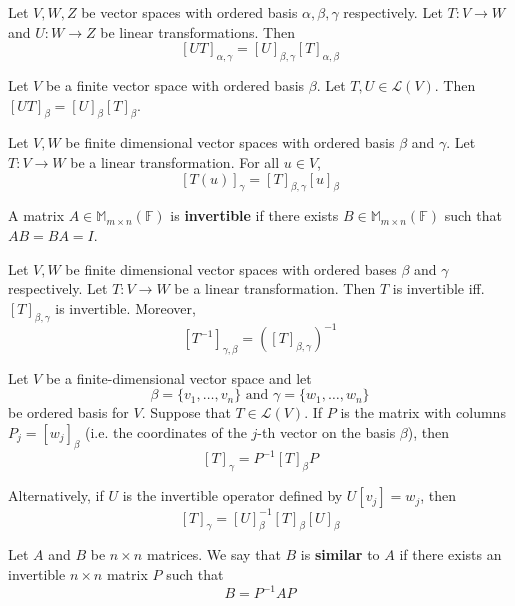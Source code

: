 \begin{theorem}
	Let $V, W, Z$ be vector spaces with ordered basis $\alpha, \beta, \gamma$ respectively. Let $T : V \longrightarrow W$ and $U : W \longrightarrow Z$ be linear transformations. Then
	\[
		[UT]_{\alpha, \gamma} = [U]_{\beta, \gamma} [T]_{\alpha, \beta}
	\]
\end{theorem}

\begin{corollary}
	Let $V$ be a finite vector space with ordered basis $\beta$. Let $T, U \in \mathcal{L}(V)$. Then $[UT]_\beta = [U]_\beta [T]_\beta$.
\end{corollary}

\begin{theorem}
	Let $V, W$ be finite dimensional vector spaces with ordered basis $\beta$ and $\gamma$. Let $T : V \longrightarrow W$ be a linear transformation. For all $u \in V$, 
	\[
		[T(u)]_\gamma = [T]_{\beta,\gamma} [u]_\beta
	\]
\end{theorem}

\begin{definition}
	A matrix $A \in \mathbb{M}_{m \times n}(\mathbb{F})$ is \textbf{invertible} if there exists $B \in \mathbb{M}_{m \times n}(\mathbb{F})$ such that $AB = BA = I$.
\end{definition}

\begin{theorem}
	Let $V, W$ be finite dimensional vector spaces with ordered bases $\beta$ and $\gamma$ respectively. Let $T : V \longrightarrow W$ be a linear transformation. Then $T$ is invertible iff. $[T]_{\beta,\gamma}$ is invertible. Moreover,
	\[ 
		[T^{-1}]_{\gamma, \beta} = ([T]_{\beta,\gamma})^{-1}
	\]
\end{theorem}

\begin{theorem}
	Let $V$ be a finite-dimensional vector space and let
	\[
		\beta = \{ v_1, \ldots, v_n \} \text{ and } \gamma = \{ w_1, \ldots, w_n \}
	\]
	be ordered basis for $V$. Suppose that $T \in \mathcal{L}(V)$. If $P$ is the matrix with columns $P_j = [w_j]_\beta$ (i.e. the coordinates of the $j$-th vector on the basis $\beta$), then
	\[
		[T]_\gamma = P^{-1} [T]_\beta P
	\]

	Alternatively, if $U$ is the invertible operator defined by $U[v_j] = w_j$, then
	\[
		[T]_\gamma = [U]_\beta^{-1} [T]_\beta [U]_\beta
	\]
\end{theorem}

\begin{definition}
	Let $A$ and $B$ be $n \times n$ matrices. We say that $B$ is \textbf{similar} to $A$ if there exists an invertible $n \times n$ matrix $P$ such that 
	\[
		B = P^{-1} A P
	\]
\end{definition}

